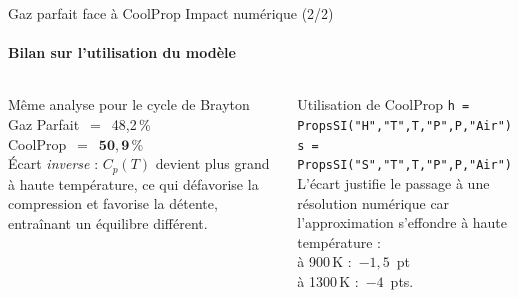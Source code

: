 \documentclass[aspectratio=43, 10pt]{beamer}
\begin{document}
\begin{frame}{Gaz parfait face \`a CoolProp \textemdash{} Impact num\'erique (2/2)}
  \framesubtitle{Bilan sur l'utilisation du mod\`ele}

  \begin{columns}[T,onlytextwidth]
      \begin{block}{M\^eme analyse pour le cycle de Brayton}
        \normalsize
        Gaz Parfait~$=$~48{,}2\,\%\\[4pt]
        CoolProp~$=$~$\mathbf{50{,}9\,\%}$\\[6pt]
        \'Ecart \textit{inverse} : $C_p(T)$ devient plus grand \`a haute temp\'erature,
        ce qui d\'efavorise la compression et favorise
        la d\'etente, entra\^inant un \'equilibre diff\'erent.
      \end{block}

      \begin{exampleblock}{Utilisation de CoolProp}
        \normalsize
        \texttt{h = PropsSI("H","T",T,"P",P,"Air")}\\[4pt]
        \texttt{s = PropsSI("S","T",T,"P",P,"Air")}\\[6pt]
        L'\'ecart justifie le passage \`a une r\'esolution num\'erique car l'approximation s'effondre \`a haute temp\'erature :\\[4pt]
        \`a 900\,K :~$-1{,}5$~pt \\
        \`a 1300\,K :~$-4$~pts.
      \end{exampleblock}
  \end{columns}

\end{frame}
\end{document}
